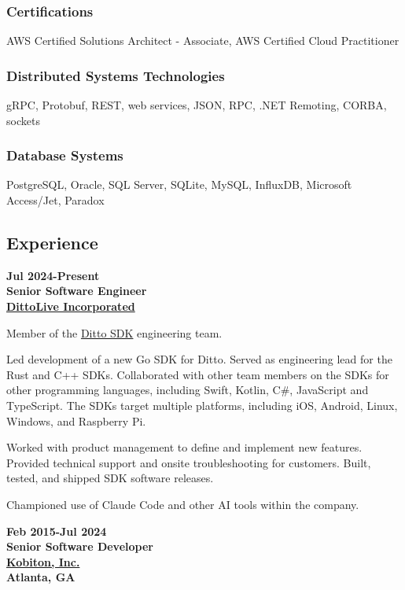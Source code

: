 \subsubsection{Certifications}\label{certifications}

AWS Certified Solutions Architect - Associate, AWS Certified Cloud
Practitioner

\subsubsection{Distributed Systems
Technologies}\label{distributed-systems-technologies}

gRPC, Protobuf, REST, web services, JSON, RPC, .NET Remoting, CORBA,
sockets

\subsubsection{Database Systems}\label{database-systems}

PostgreSQL, Oracle, SQL Server, SQLite, MySQL, InfluxDB, Microsoft
Access/Jet, Paradox

\subsection{Experience}\label{experience}

\textbf{Jul 2024-Present\\
Senior Software Engineer\\
\href{https://ditto.com}{DittoLive Incorporated}}

Member of the \href{https://docs.ditto.live/sdk/latest}{Ditto SDK}
engineering team.

Led development of a new Go SDK for Ditto. Served as engineering lead
for the Rust and C++ SDKs. Collaborated with other team members on the
SDKs for other programming languages, including Swift, Kotlin, C\#,
JavaScript and TypeScript. The SDKs target multiple platforms, including
iOS, Android, Linux, Windows, and Raspberry Pi.

Worked with product management to define and implement new features.
Provided technical support and onsite troubleshooting for customers.
Built, tested, and shipped SDK software releases.

Championed use of Claude Code and other AI tools within the company.

\textbf{Feb 2015-Jul 2024\\
Senior Software Developer\\
\href{https://kobiton.com}{Kobiton, Inc.}\\
Atlanta, GA}

